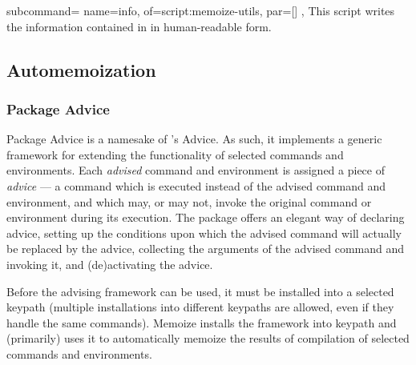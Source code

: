 \documentclass[a4paper,11pt]{article}
\begin{document}
\begin{doc}{
    subcommand={
      name=info,
      of=script:memoize-utils,
      par={[] },
    }
  }
  This script writes the information contained in 
  in human-readable form.
\end{doc}


\subsection{Automemoization}
\label{sec:ref:advicememoization}


\subsubsection{Package Advice}
\label{sec:ref:advice}

Package Advice is a namesake of \Emacs's Advice.  As such, it implements a
generic framework for extending the functionality of selected commands and
environments.  Each \emph{advised} command and environment is assigned a piece
of \emph{advice} --- a command which is executed instead of the advised command
and environment, and which may, or may not, invoke the original command or
environment during its execution.  The package offers an elegant way of
declaring advice, setting up the conditions upon which the advised command will
actually be replaced by the advice, collecting the arguments of the advised
command and invoking it, and (de)activating the advice.

Before the advising framework can be used, it must be installed into a selected
 keypath (multiple installations into different keypaths are
allowed, even if they handle the same commands).  Memoize installs the
framework into keypath  and (primarily) uses it to
automatically memoize the results of compilation of selected commands and
environments.
\end{document}
